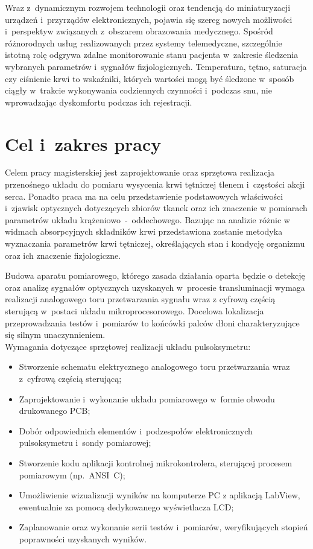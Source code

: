 Wraz z~dynamicznym rozwojem technologii oraz tendencją do miniaturyzacji urządzeń i~przyrządów elektronicznych, pojawia się szereg nowych możliwości
i~perspektyw związanych z~obszarem obrazowania medycznego. Spośród różnorodnych usług realizowanych przez systemy telemedyczne, szczególnie istotną 
rolę odgrywa zdalne monitorowanie stanu pacjenta w~zakresie śledzenia wybranych parametrów i~sygnałów fizjologicznych. Temperatura, tętno, saturacja
czy ciśnienie krwi to wskaźniki, których wartości mogą być śledzone w~sposób ciągły w~trakcie wykonywania codziennych czynności i~podczas snu, nie 
wprowadzając dyskomfortu podczas ich rejestracji. 

\section*{Cel i~zakres pracy}
\label{sec:celePracy}

Celem pracy magisterskiej jest zaprojektowanie oraz sprzętowa realizacja przenośnego układu do pomiaru wysycenia krwi tętniczej tlenem 
i~częstości akcji serca. Ponadto praca ma na celu przedstawienie podstawowych właściwości i~zjawisk optycznych dotyczących zbiorów tkanek 
oraz ich znaczenie w pomiarach parametrów układu krążeniowo~-~oddechowego. Bazując na analizie różnic w widmach absorpcyjnych składników
krwi przedstawiona zostanie metodyka wyznaczania parametrów krwi tętniczej, określających stan i kondycję organizmu oraz ich znaczenie fizjologiczne.

Budowa aparatu pomiarowego, którego zasada działania oparta będzie o detekcję oraz analizę sygnałów optycznych uzyskanych w~procesie 
transluminacji wymaga realizacji analogowego toru przetwarzania sygnału wraz z cyfrową częścią sterującą w~postaci układu mikroprocesorowego. 
Docelowa lokalizacja przeprowadzania testów i~pomiarów to końcówki palców dłoni charakteryzujące się silnym unaczynnieniem.\\ 

\noindent Wymagania dotyczące sprzętowej realizacji układu pulsoksymetru:
\begin{itemize}
	\item Stworzenie schematu elektrycznego analogowego toru przetwarzania wraz z~cyfrową częścią sterującą;
	\item Zaprojektowanie i~wykonanie układu pomiarowego w~formie obwodu drukowanego PCB;
	\item Dobór odpowiednich elementów i~podzespołów elektronicznych pulsoksymetru i~sondy pomiarowej;
	\item Stworzenie kodu aplikacji kontrolnej mikrokontrolera, sterującej procesem pomiarowym (np.~ANSI~C);
	\item Umożliwienie wizualizacji wyników na komputerze PC z aplikacją LabView, ewentualnie za pomocą dedykowanego wyświetlacza LCD;
	\item Zaplanowanie oraz wykonanie serii testów i~pomiarów, weryfikujących stopień poprawności uzyskanych wyników.
\end{itemize}

